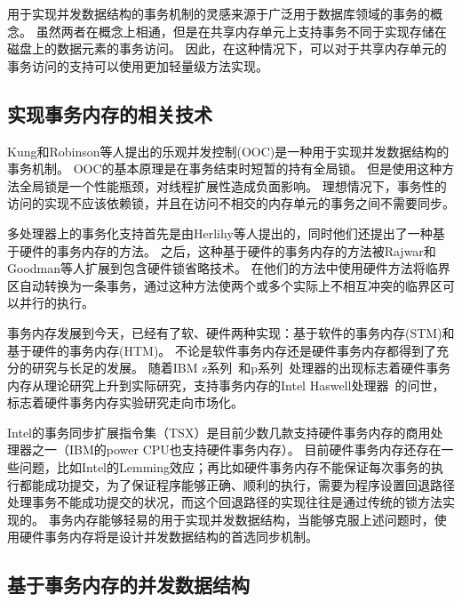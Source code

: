 用于实现并发数据结构的事务机制的灵感来源于广泛用于数据库领域的事务的概念。
虽然两者在概念上相通，但是在共享内存单元上支持事务不同于实现存储在磁盘上的数据元素的事务访问。
因此，在这种情况下，可以对于共享内存单元的事务访问的支持可以使用更加轻量级方法实现。

\subsection{实现事务内存的相关技术}
Kung和Robinson等人提出的乐观并发控制(OOC)\cite{kung1981optimistic}是一种用于实现并发数据结构的事务机制。
OOC的基本原理是在事务结束时短暂的持有全局锁。
但是使用这种方法全局锁是一个性能瓶颈，对线程扩展性造成负面影响。
理想情况下，事务性的访问的实现不应该依赖锁，并且在访问不相交的内存单元的事务之间不需要同步。

多处理器上的事务化支持首先是由Herlihy等人\cite{herlihy1993transactional}提出的，同时他们还提出了一种基于硬件的事务内存的方法。
之后，这种基于硬件的事务内存的方法被Rajwar和Goodman等人扩展到包含硬件锁省略技术\cite{rajwar2001speculative,rajwar2002transactional}。
在他们的方法中使用硬件方法将临界区自动转换为一条事务，通过这种方法使两个或多个实际上不相互冲突的临界区可以并行的执行。

事务内存发展到今天，已经有了软、硬件两种实现：基于软件的事务内存(STM)和基于硬件的事务内存(HTM)。
不论是软件事务内存\cite{spear2010lightweight,saha2006mcrt,shavit1997software,linfei2010,wangruibo2007}还是硬件事务内存\cite{yen2007logtm,moore2006logtm,dalessandro2011hybrid,wangzhaoguo2014}都得到了充分的研究与长足的发展。
随着IBM z系列~\cite{Cain2013Robust}和p系列~\cite{Wang2012Evaluation}处理器的出现标志着硬件事务内存从理论研究上升到实际研究，支持事务内存的Intel Haswell处理器~\cite{Intel2015Intel}的问世，标志着硬件事务内存实验研究走向市场化。

Intel的事务同步扩展指令集（TSX）是目前少数几款支持硬件事务内存的商用处理器之一（IBM的power CPU也支持硬件事务内存）。
目前硬件事务内存还存在一些问题，比如Intel的Lemming效应\cite{Afek2014Software}；再比如硬件事务内存不能保证每次事务的执行都能成功提交，为了保证程序能够正确、顺利的执行，需要为程序设置回退路径处理事务不能成功提交的状况，而这个回退路径的实现往往是通过传统的锁方法实现的。
事务内存能够轻易的用于实现并发数据结构，当能够克服上述问题时，使用硬件事务内存将是设计并发数据结构的首选同步机制。

\subsection{基于事务内存的并发数据结构}

